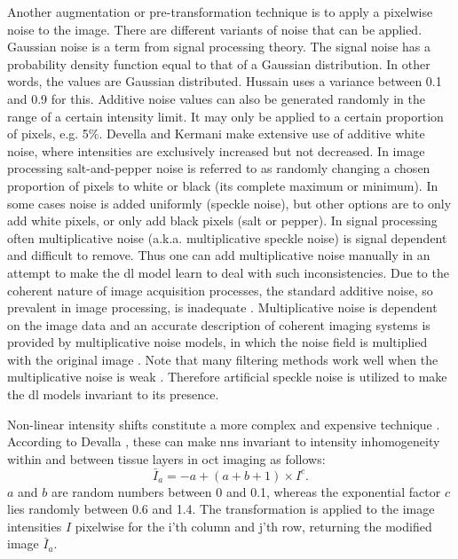 Another augmentation or pre-transformation technique is to apply a pixelwise noise to the image. There are different variants of noise that can be applied. Gaussian noise \cite{Kuwayama.2019, hussain.2018} is a term from signal processing theory. The signal noise has a probability density function equal to that of a Gaussian distribution. In other words, the values are Gaussian distributed. Hussain uses a variance between 0.1 and 0.9 for this. Additive noise values can also be generated randomly \cite{Kuwayama.2019} in the range of a certain intensity limit. It may only be applied to a certain proportion of pixels, e.g. 5\%. Devella and Kermani make extensive use of additive white noise, where intensities are exclusively increased but not decreased. \cite{Devalla.2018, Kermani.2016}
In image processing salt-and-pepper noise is referred to as randomly changing a chosen proportion of pixels to white or black (its complete maximum or minimum). In some cases noise is added uniformly (speckle noise), but other options are to only add white pixels, or only add black pixels (salt or pepper).
In signal processing often multiplicative noise (a.k.a. multiplicative speckle noise) \cite{Devalla.2018, Girard.2013, Kermani.2016} is signal dependent and difficult to remove. \cite{Chen.2012} Thus one can add multiplicative noise manually in an attempt to make the \acrshort{dl} model learn to deal with such inconsistencies. Due to the coherent nature of image acquisition processes, the standard additive noise, so prevalent in image processing, is inadequate \cite{Chen.2012}. Multiplicative noise is dependent on the image data and an accurate description of coherent imaging systems is provided by multiplicative noise models, in which the noise field is multiplied with the original image \cite{BioucasDiasJoseM..2010}. Note that many filtering methods work well when the multiplicative noise is weak \cite{Chen.2012}. Therefore artificial speckle noise is utilized to make the \acrshort{dl} models invariant to its presence.

Non-linear intensity shifts constitute a more complex and expensive technique \cite{Lang.2018, Devalla.2018}.
According to Devalla \cite{Devalla.2018}, these can make \acrshort{nn}s invariant to intensity inhomogeneity within and between tissue layers in \acrshort{oct} imaging as follows:
\begin{equation}
\bar{I}_a =-a+(a+b+1) \times I^{c}.
\end{equation}
\( a \) and \( b \) are random numbers between 0 and 0.1, whereas the exponential factor \( c \) lies randomly between 0.6 and 1.4. The transformation is applied to the image intensities \( I \) pixelwise for the i'th column and j'th row, returning the modified image \( \bar{I}_a \).

